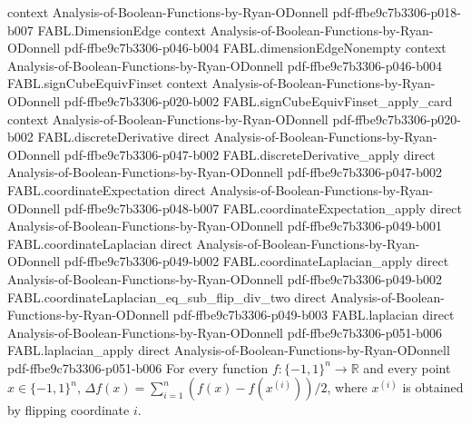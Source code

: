 \begin{theorem}
  {context}
  {Analysis-of-Boolean-Functions-by-Ryan-ODonnell}
  {pdf-ffbe9c7b3306-p018-b007}
\proofstep
  {FABL.DimensionEdge}
  {context}
  {Analysis-of-Boolean-Functions-by-Ryan-ODonnell}
  {pdf-ffbe9c7b3306-p046-b004}
\proofstep
  {FABL.dimensionEdgeNonempty}
  {context}
  {Analysis-of-Boolean-Functions-by-Ryan-ODonnell}
  {pdf-ffbe9c7b3306-p046-b004}
\proofstep
  {FABL.signCubeEquivFinset}
  {context}
  {Analysis-of-Boolean-Functions-by-Ryan-ODonnell}
  {pdf-ffbe9c7b3306-p020-b002}
\proofstep
  {FABL.signCubeEquivFinset_apply_card}
  {context}
  {Analysis-of-Boolean-Functions-by-Ryan-ODonnell}
  {pdf-ffbe9c7b3306-p020-b002}
\proofstep
  {FABL.discreteDerivative}
  {direct}
  {Analysis-of-Boolean-Functions-by-Ryan-ODonnell}
  {pdf-ffbe9c7b3306-p047-b002}
\proofstep
  {FABL.discreteDerivative_apply}
  {direct}
  {Analysis-of-Boolean-Functions-by-Ryan-ODonnell}
  {pdf-ffbe9c7b3306-p047-b002}
\proofstep
  {FABL.coordinateExpectation}
  {direct}
  {Analysis-of-Boolean-Functions-by-Ryan-ODonnell}
  {pdf-ffbe9c7b3306-p048-b007}
\proofstep
  {FABL.coordinateExpectation_apply}
  {direct}
  {Analysis-of-Boolean-Functions-by-Ryan-ODonnell}
  {pdf-ffbe9c7b3306-p049-b001}
\proofstep
  {FABL.coordinateLaplacian}
  {direct}
  {Analysis-of-Boolean-Functions-by-Ryan-ODonnell}
  {pdf-ffbe9c7b3306-p049-b002}
\proofstep
  {FABL.coordinateLaplacian_apply}
  {direct}
  {Analysis-of-Boolean-Functions-by-Ryan-ODonnell}
  {pdf-ffbe9c7b3306-p049-b002}
\proofstep
  {FABL.coordinateLaplacian_eq_sub_flip_div_two}
  {direct}
  {Analysis-of-Boolean-Functions-by-Ryan-ODonnell}
  {pdf-ffbe9c7b3306-p049-b003}
\proofstep
  {FABL.laplacian}
  {direct}
  {Analysis-of-Boolean-Functions-by-Ryan-ODonnell}
  {pdf-ffbe9c7b3306-p051-b006}
\proofstep
  {FABL.laplacian_apply}
  {direct}
  {Analysis-of-Boolean-Functions-by-Ryan-ODonnell}
  {pdf-ffbe9c7b3306-p051-b006}
For every function $f:\{-1,1\}^n\to\mathbb R$ and every point $x\in\{-1,1\}^n$, $\Delta
f(x)=\sum_{i=1}^n (f(x)-f(x^{(i)}))/2$, where $x^{(i)}$ is obtained by flipping
coordinate $i$.
\end{theorem}

